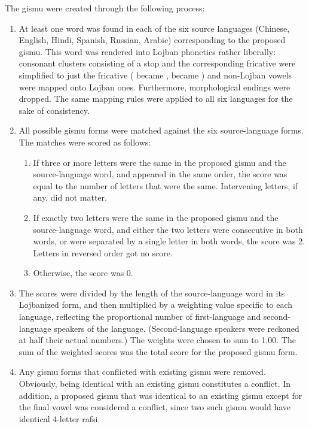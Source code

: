 The gismu were created through the following process:
\begin{enumerate}
\item At least one word was found in each of the six source languages (Chinese, English, Hindi, Spanish, Russian, Arabic) corresponding to the proposed gismu. This word was rendered into Lojban phonetics rather liberally: consonant clusters consisting of a stop and the corresponding fricative were simplified to just the fricative ( became ,  became ) and non-Lojban vowels were mapped onto Lojban ones. Furthermore, morphological endings were dropped. The same mapping rules were applied to all six languages for the sake of consistency.
\item All possible gismu forms were matched against the six source-language forms. The matches were scored as follows: \begin{enumerate}
\item If three or more letters were the same in the proposed gismu and the source-language word, and appeared in the same order, the score was equal to the number of letters that were the same. Intervening letters, if any, did not matter.
\item If exactly two letters were the same in the proposed gismu and the source-language word, and either the two letters were consecutive in both words, or were separated by a single letter in both words, the score was 2. Letters in reversed order got no score.
\item Otherwise, the score was 0.
\end{enumerate}

\item The scores were divided by the length of the source-language word in its Lojbanized form, and then multiplied by a weighting value specific to each language, reflecting the proportional number of first-language and second-language speakers of the language. (Second-language speakers were reckoned at half their actual numbers.) The weights were chosen to sum to 1.00. The sum of the weighted scores was the total score for the proposed gismu form.
\item Any gismu forms that conflicted with existing gismu were removed. Obviously, being identical with an existing gismu constitutes a conflict. In addition, a proposed gismu that was identical to an existing gismu except for the final vowel was considered a conflict, since two such gismu would have identical 4-letter rafsi.


\end{enumerate}
